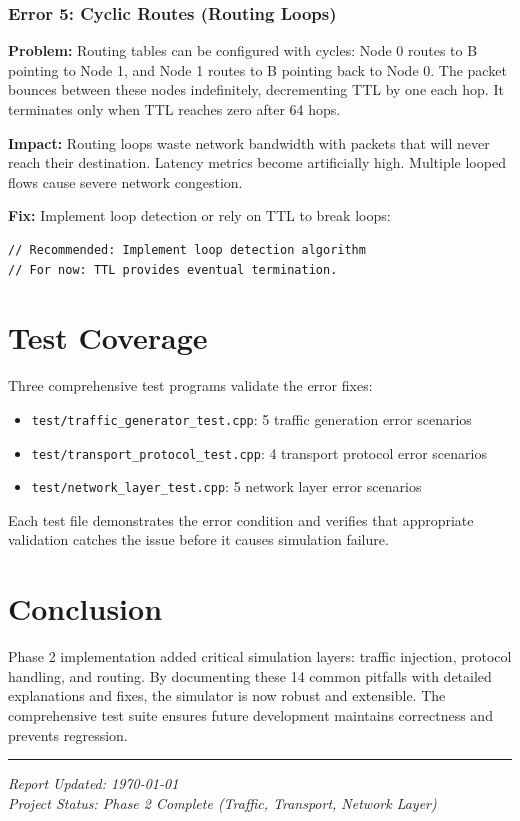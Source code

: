 \documentclass[11pt,a4paper]{article}
\begin{document}
\vspace{0.5cm}

\subsubsection{Error 5: Cyclic Routes (Routing Loops)}

\textbf{Problem:}
Routing tables can be configured with cycles: Node 0 routes to B pointing to Node 1, and Node 1 routes to B pointing back to Node 0. The packet bounces between these nodes indefinitely, decrementing TTL by one each hop. It terminates only when TTL reaches zero after 64 hops.

\textbf{Impact:}
Routing loops waste network bandwidth with packets that will never reach their destination. Latency metrics become artificially high. Multiple looped flows cause severe network congestion.

\textbf{Fix:}
Implement loop detection or rely on TTL to break loops:
\begin{lstlisting}
// Recommended: Implement loop detection algorithm
// For now: TTL provides eventual termination.
\end{lstlisting}

\vspace{0.5cm}

\section{Test Coverage}

Three comprehensive test programs validate the error fixes:
\begin{itemize}
    \item \texttt{test/traffic\_generator\_test.cpp}: 5 traffic generation error scenarios
    \item \texttt{test/transport\_protocol\_test.cpp}: 4 transport protocol error scenarios
    \item \texttt{test/network\_layer\_test.cpp}: 5 network layer error scenarios
\end{itemize}

Each test file demonstrates the error condition and verifies that appropriate validation catches the issue before it causes simulation failure.

\section{Conclusion}

Phase 2 implementation added critical simulation layers: traffic injection, protocol handling, and routing. By documenting these 14 common pitfalls with detailed explanations and fixes, the simulator is now robust and extensible. The comprehensive test suite ensures future development maintains correctness and prevents regression.

\vfill
\hrule
\vspace{0.5cm}
\noindent
\textit{Report Updated: \today} \\
\textit{Project Status: Phase 2 Complete (Traffic, Transport, Network Layer)}
\end{document}
